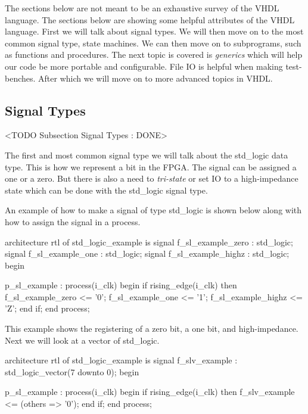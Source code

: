 The sections below are not meant to be an exhaustive survey of the \ac{VHDL} language. The sections below are showing some helpful attributes of the \ac{VHDL} language. First we will talk about signal types. We will then move on to the most common signal type, state machines. We can then move on to subprograms, such as functions and procedures. The next topic is covered is \emph{generics} which will help our code be more portable and configurable. File \ac{IO} is helpful when making test-benches. After which we will move on to more advanced topics in \ac{VHDL}.

\subsection{Signal Types}
	<TODO Subsection Signal Types : DONE>

The first and most common signal type we will talk about the std\_logic data type. This is how we represent a bit in the \ac{FPGA}. The signal can be assigned a one or a zero. But there is also a need to \emph{tri-state} or set \ac{IO} to a high-impedance state which can be done with the std\_logic signal type. 

An example of how to make a signal of type std\_logic is shown below along with how to assign the signal in a process.

\begin{VHDLlisting}[tabsize=4]
architecture rtl of std_logic_example is
    signal f_sl_example_zero     : std_logic;
    signal f_sl_example_one      : std_logic;
    signal f_sl_example_highz    : std_logic;
begin

p_sl_example : process(i_clk)
begin
    if rising_edge(i_clk) then
        f_sl_example_zero  <= '0';
        f_sl_example_one   <= '1';
        f_sl_example_highz <= 'Z';
    end if;
end process;
\end{VHDLlisting}

This example shows the registering of a zero bit, a one bit, and high-impedance. Next we will look at a vector of std\_logic.

\begin{VHDLlisting}[tabsize=4]
architecture rtl of std_logic_example is
    signal f_slv_example  : std_logic_vector(7 downto 0);
begin

p_sl_example : process(i_clk)
begin
    if rising_edge(i_clk) then
        f_slv_example <= (others => '0');
    end if;
end process;
\end{VHDLlisting}

